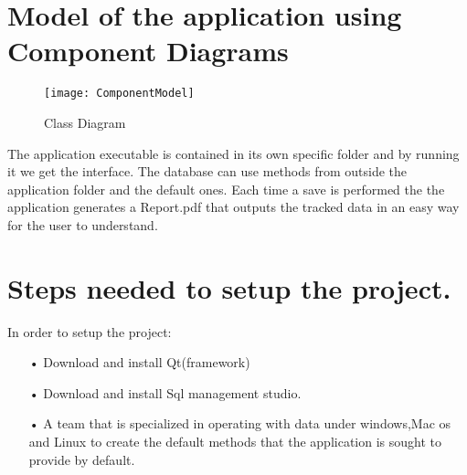 
\setlength{\parindent}{2ex}
\section{Model of the application using Component Diagrams}
\par
\begin{figure}[h!]
	\centering
	\texttt{[image: ComponentModel]}
	\caption{Class Diagram} 
\end{figure}
The application executable is contained in its own specific folder and by running it we get the interface.
The database can use methods from outside the application folder and the default ones.
Each time a save is performed the the application generates a Report.pdf that outputs the tracked data in an easy way for the user to understand.
\newpage
\section{Steps needed to setup the project.}
In order to setup the project:
\begin{itemize}
\item[•] Download and install Qt(framework)
\item[•] Download and install Sql management studio.
\item[•] A team that is specialized in operating with data under windows,Mac os and Linux to create the default methods that the application is sought to provide by default.
\end{itemize}

\clearpage
